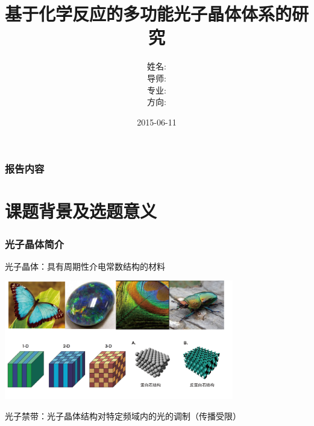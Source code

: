 \documentclass{beamer}
\begin{document}
\title{基于化学反应的多功能光子晶体体系的研究}
\author[田天]{姓名: \\
  导师: \\
  专业: \\
  方向: \\
  }
\date{2015-06-11}


\begin{frame}
	\titlepage
\end{frame}


\begin{frame}
	\frametitle{报告内容}
	\tableofcontents
\end{frame}




\section{课题背景及选题意义}
\begin{frame}
  \frametitle{光子晶体简介}
  光子晶体：具有周期性介电常数结构的材料
  \begin{center}
    \includegraphics[width=10cm]{figures/PhC.png}
  \end{center}
  光子禁带：光子晶体结构对特定频域内的光的调制（传播受限）
\end{frame}
\end{document}
